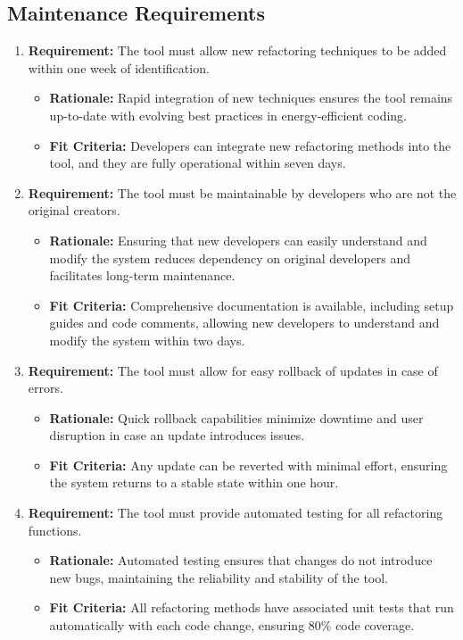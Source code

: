 \documentclass[12pt]{article}
\begin{document}
\subsection{Maintenance Requirements}
\begin{enumerate}
  \item \textbf{Requirement:} The tool must allow new refactoring techniques to be added within one week of identification.
     \begin{itemize}
         \item \textbf{Rationale:} Rapid integration of new techniques ensures the tool remains up-to-date with evolving best practices in energy-efficient coding.
         \item \textbf{Fit Criteria:} Developers can integrate new refactoring methods into the tool, and they are fully operational within seven days.
     \end{itemize}
     
  \item \textbf{Requirement:} The tool must be maintainable by developers who are not the original creators.
     \begin{itemize}
         \item \textbf{Rationale:} Ensuring that new developers can easily understand and modify the system reduces dependency on original developers and facilitates long-term maintenance.
         \item \textbf{Fit Criteria:} Comprehensive documentation is available, including setup guides and code comments, allowing new developers to understand and modify the system within two days.
     \end{itemize}
     
  \item \textbf{Requirement:} The tool must allow for easy rollback of updates in case of errors.
     \begin{itemize}
         \item \textbf{Rationale:} Quick rollback capabilities minimize downtime and user disruption in case an update introduces issues.
         \item \textbf{Fit Criteria:} Any update can be reverted with minimal effort, ensuring the system returns to a stable state within one hour.
     \end{itemize}
     
  \item \textbf{Requirement:} The tool must provide automated testing for all refactoring functions.
     \begin{itemize}
         \item \textbf{Rationale:} Automated testing ensures that changes do not introduce new bugs, maintaining the reliability and stability of the tool.
         \item \textbf{Fit Criteria:} All refactoring methods have associated unit tests that run automatically with each code change, ensuring 80\% code coverage.
     \end{itemize}
     

\end{enumerate}
\end{document}
